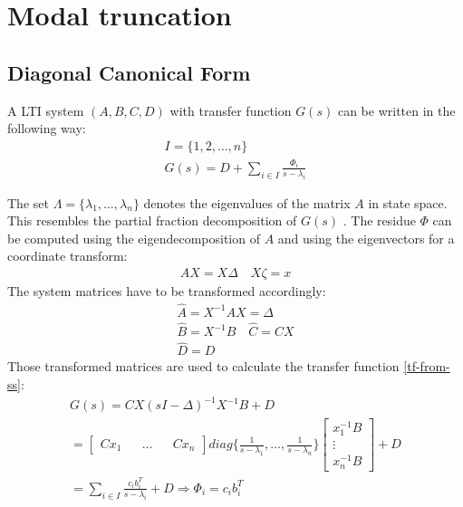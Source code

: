 \section{Modal truncation}
\subsection{Diagonal Canonical Form} \label{dcnf}
A LTI system \((A, B, C, D)\) with transfer function \(G(s)\) can be written in the following way:
\begin{gather}
I = \{1, 2, \hdots, n\} \\
G(s) = D + \sum_{i \in I} \frac{\Phi_i}{s-\lambda_i} \label{dcnf}
\end{gather}

The set \(\Lambda = \{\lambda_1, \hdots, \lambda_n\}\) denotes the eigenvalues of the matrix \(A\) in state space.
This resembles the partial fraction decomposition of \(G(s)\) \cite{vuillemin2020optimal}.
The residue \(\Phi\) can be computed using the eigendecomposition of \(A\) and using the eigenvectors for a coordinate transform:
\begin{gather}
AX = X\Delta \quad X \zeta =  x 
\end{gather}
The system matrices have to be transformed accordingly:
\begin{gather}
\hat{A} = X^{-1}AX = \Delta \\
\hat{B} = X^{-1}B \quad \hat{C} = CX \\
\hat{D} = D
\end{gather}
Those transformed matrices are used to calculate the transfer function \ref{tf-from-ss}:
\begin{gather}
G(s) = CX(sI - \Delta)^{-1}X^{-1}B + D\\
= \begin{bmatrix}
C x_1 && \hdots && Cx_n
\end{bmatrix} diag\{\frac{1}{s-\lambda_1}, \hdots, \frac{1}{s-\lambda_n}\} \begin{bmatrix}
x_1^{-1}B \\
\vdots \\
x_n^{-1}B
\end{bmatrix} + D \\
= \sum_{i \in I} \frac{c_i b_i^{T}}{s - \lambda_i}  + D
\Rightarrow \Phi_i = c_i b_i^{T}
\end{gather}
\cite{Benner}

